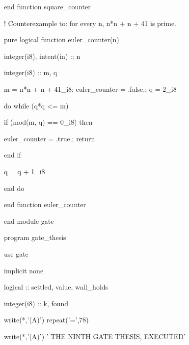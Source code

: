 \documentclass[10pt,twocolumn]{article}
\newenvironment{Shaded}{}{}
\newcommand{\BuiltInTok}[1]{#1}
\newcommand{\CommentTok}[1]{#1}
\newcommand{\ConstantTok}[1]{#1}
\newcommand{\DataTypeTok}[1]{#1}
\newcommand{\DecValTok}[1]{#1}
\newcommand{\FunctionTok}[1]{#1}
\newcommand{\KeywordTok}[1]{#1}
\newcommand{\NormalTok}[1]{#1}
\newcommand{\OperatorTok}[1]{#1}
\newcommand{\StringTok}[1]{#1}
\providecommand{\BuiltInTok}[1]{#1}
\providecommand{\CommentTok}[1]{#1}
\providecommand{\ConstantTok}[1]{#1}
\providecommand{\DataTypeTok}[1]{#1}
\providecommand{\DecValTok}[1]{#1}
\providecommand{\FunctionTok}[1]{#1}
\providecommand{\KeywordTok}[1]{#1}
\providecommand{\NormalTok}[1]{#1}
\providecommand{\OperatorTok}[1]{#1}
\providecommand{\StringTok}[1]{#1}
\providecommand{\textquotesingle}{'}
\providecommand{\BuiltInTok}[1]{#1}
\providecommand{\CommentTok}[1]{#1}
\providecommand{\ConstantTok}[1]{#1}
\providecommand{\DataTypeTok}[1]{#1}
\providecommand{\DecValTok}[1]{#1}
\providecommand{\FunctionTok}[1]{#1}
\providecommand{\KeywordTok}[1]{#1}
\providecommand{\NormalTok}[1]{#1}
\providecommand{\OperatorTok}[1]{#1}
\providecommand{\StringTok}[1]{#1}
\begin{document}
\begin{strip}
\begin{Shaded}
\begin{Highlighting}[]
  \KeywordTok{end function}\NormalTok{ square\_counter}

  \CommentTok{! Counterexample to: for every n, n*n + n + 41 is prime.}

  \KeywordTok{pure} \DataTypeTok{logical} \KeywordTok{function}\NormalTok{ euler\_counter(n)}

    \DataTypeTok{integer(i8)}\NormalTok{, }\DataTypeTok{intent(in)} \DataTypeTok{::}\NormalTok{ n}

    \DataTypeTok{integer(i8)} \DataTypeTok{::}\NormalTok{ m, q}

\NormalTok{    m }\KeywordTok{=}\NormalTok{ n}\KeywordTok{*}\NormalTok{n }\KeywordTok{+}\NormalTok{ n }\KeywordTok{+} \DecValTok{41\_i8}\NormalTok{;  euler\_counter }\KeywordTok{=} \ConstantTok{.false.}\NormalTok{;  q }\KeywordTok{=} \DecValTok{2\_i8}

    \KeywordTok{do} \KeywordTok{while}\NormalTok{ (q}\KeywordTok{*}\NormalTok{q }\OperatorTok{\textless{}=}\NormalTok{ m)}

       \KeywordTok{if}\NormalTok{ (}\BuiltInTok{mod}\NormalTok{(m, q) }\OperatorTok{==} \DecValTok{0\_i8}\NormalTok{) }\KeywordTok{then}

\NormalTok{          euler\_counter }\KeywordTok{=} \ConstantTok{.true.}\NormalTok{;  }\KeywordTok{return}

       \KeywordTok{end if}

\NormalTok{       q }\KeywordTok{=}\NormalTok{ q }\KeywordTok{+} \DecValTok{1\_i8}

    \KeywordTok{end do}

  \KeywordTok{end function}\NormalTok{ euler\_counter}

\KeywordTok{end module}\NormalTok{ gate}

\KeywordTok{program}\NormalTok{ gate\_thesis}

  \KeywordTok{use}\NormalTok{ gate}

  \KeywordTok{implicit} \KeywordTok{none}

  \DataTypeTok{logical} \DataTypeTok{::}\NormalTok{ settled, value, wall\_holds}

  \DataTypeTok{integer(i8)} \DataTypeTok{::}\NormalTok{ k, found}

  \FunctionTok{write(*}\NormalTok{,}\StringTok{\textquotesingle{}(A)\textquotesingle{}}\FunctionTok{)} \FunctionTok{repeat}\NormalTok{(}\StringTok{\textquotesingle{}=\textquotesingle{}}\NormalTok{,}\DecValTok{78}\NormalTok{)}

  \FunctionTok{write(*}\NormalTok{,}\StringTok{\textquotesingle{}(A)\textquotesingle{}}\FunctionTok{)} \StringTok{\textquotesingle{} THE NINTH GATE THESIS, EXECUTED\textquotesingle{}}


\end{Highlighting}
\end{Shaded}
\end{strip}
\end{document}
